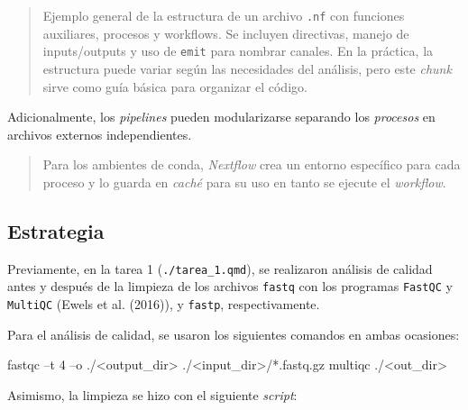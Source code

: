 \documentclass[
  letterpaper,
  DIV=11,
  numbers=noendperiod]{scrartcl}
\newenvironment{Shaded}{\begin{snugshade}}{\end{snugshade}}
\newcommand{\ExtensionTok}[1]{\textcolor[rgb]{0.00,0.23,0.31}{#1}}
\newcommand{\NormalTok}[1]{\textcolor[rgb]{0.00,0.23,0.31}{#1}}
\newcommand{\OperatorTok}[1]{\textcolor[rgb]{0.37,0.37,0.37}{#1}}
\newcommand{\PreprocessorTok}[1]{\textcolor[rgb]{0.68,0.00,0.00}{#1}}
\begin{document}
\begin{quote}
Ejemplo general de la estructura de un archivo \texttt{.nf} con
funciones auxiliares, procesos y workflows. Se incluyen directivas,
manejo de inputs/outputs y uso de \texttt{emit} para nombrar canales. En
la práctica, la estructura puede variar según las necesidades del
análisis, pero este \emph{chunk} sirve como guía básica para organizar
el código.
\end{quote}

Adicionalmente, los \emph{pipelines} pueden modularizarse separando los
\emph{procesos} en archivos externos independientes.

\begin{quote}
Para los ambientes de conda, \emph{Nextflow} crea un entorno específico
para cada proceso y lo guarda en \emph{caché} para su uso en tanto se
ejecute el \emph{workflow}.
\end{quote}

\subsection{Estrategia}\label{estrategia}

Previamente, en la tarea 1 (\texttt{./tarea\_1.qmd}), se realizaron
análisis de calidad antes y después de la limpieza de los archivos
\texttt{fastq} con los programas \texttt{FastQC} y \texttt{MultiQC}
(Ewels et al. (2016)), y \texttt{fastp}, respectivamente.

Para el análisis de calidad, se usaron los siguientes comandos en ambas
ocasiones:

\begin{Shaded}
\begin{Highlighting}[]
\ExtensionTok{fastqc}\NormalTok{ –t 4 –o ./}\OperatorTok{\textless{}}\NormalTok{output\_dir}\OperatorTok{\textgreater{}}\NormalTok{ ./}\OperatorTok{\textless{}}\NormalTok{input\_dir}\OperatorTok{\textgreater{}}\NormalTok{/}\PreprocessorTok{*}\NormalTok{.fastq.gz}
\ExtensionTok{multiqc}\NormalTok{ ./}\OperatorTok{\textless{}}\NormalTok{out\_dir}\OperatorTok{\textgreater{}}
\end{Highlighting}
\end{Shaded}

Asimismo, la limpieza se hizo con el siguiente \emph{script}:
\end{document}
